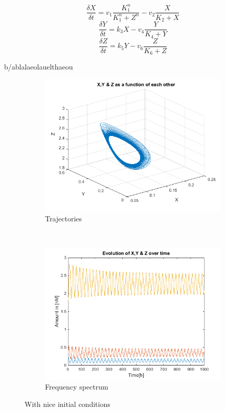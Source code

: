 \documentclass[10pt,a4paper,oneside,twocolumn]{article}
\numberwithin{equation}{section} %
\begin{document}
    \begin{equation*}\frac{\delta X}{\delta t} = v_1 \frac{K_1^n}{K_1^n + Z^n} - v_2 \frac{X}{K_2 + X} \end{equation*}
    \begin{equation*}\frac{\delta Y}{\delta t} = k_3 X - v_4 \frac{Y}{K_4 + Y}\end{equation*}
    \begin{equation*}\frac{\delta Z}{\delta t} = k_5 Y - v_6 \frac{Z}{K_6 + Z}\end{equation*}


    b/ablalaeolauelthaeou

    \begin{figure}[!h]
	\begin{subfigure}[b]{0.5\textwidth}
	    \includegraphics[width=\textwidth]{A11.png}
	    \caption{Trajectories}
	\end{subfigure}
	~
	\begin{subfigure}[b]{0.5\textwidth}
	    \includegraphics[width=\textwidth]{A12.png}
	    \caption{Frequency spectrum}
	\end{subfigure}
	\caption{With nice initial conditions}
    \end{figure}
\end{document}
